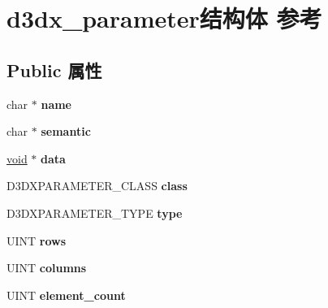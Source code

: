 \hypertarget{structd3dx__parameter}{}\section{d3dx\+\_\+parameter结构体 参考}
\label{structd3dx__parameter}
\subsection*{Public 属性}
\begin{DoxyCompactItemize}
\item 
\mbox{\label{structd3dx__parameter_ac4e45fe2652d234c2570821684bec38e}} 
char $\ast$ {\bfseries name}
\item 
\mbox{\label{structd3dx__parameter_a138c31587cc19edd400b9158c84c3c29}} 
char $\ast$ {\bfseries semantic}
\item 
\mbox{\label{structd3dx__parameter_a7e442164975103758bc0ece6ace5a1d2}} 
\hyperlink{interfacevoid}{void} $\ast$ {\bfseries data}
\item 
\mbox{\label{structd3dx__parameter_adde5482a7586ba1254e80dc2622235a7}} 
D3\+D\+X\+P\+A\+R\+A\+M\+E\+T\+E\+R\+\_\+\+C\+L\+A\+SS {\bfseries class}
\item 
\mbox{\label{structd3dx__parameter_a4eea3108443d2ff9ac1fb7f060fe7611}} 
D3\+D\+X\+P\+A\+R\+A\+M\+E\+T\+E\+R\+\_\+\+T\+Y\+PE {\bfseries type}
\item 
\mbox{\label{structd3dx__parameter_a4c8c98842ddbf96c360bb580cd19e1b2}} 
U\+I\+NT {\bfseries rows}
\item 
\mbox{\label{structd3dx__parameter_ae1af8a6adf6f69f9a576e9082b6fe872}} 
U\+I\+NT {\bfseries columns}
\item 
\mbox{\label{structd3dx__parameter_a3f6d8988b5ede84b2c3187ab049a4f49}} 
U\+I\+NT {\bfseries element\+\_\+count}
\item 
\mbox{\label{structd3dx__parameter_aa801bdf47c116cb6d8cd588ba4875bd5}} 

\end{DoxyCompactItemize}

